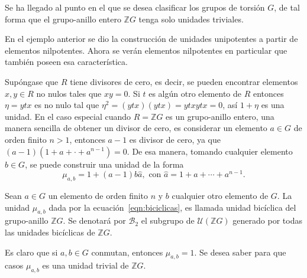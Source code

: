 Se ha llegado al punto en el que se desea clasificar los grupos de torsión $G$, de tal forma que el grupo-anillo entero $\mathds{Z}G$ tenga solo unidades triviales.

\begin{ejemplo}
En el ejemplo anterior se dio la construcción de unidades unipotentes a partir de elementos nilpotentes. Ahora se verán elementos nilpotentes en particular que también poseen esa característica. 

Supóngase que $R$ tiene divisores de cero, es decir, se pueden encontrar elementos $x,y \in R$ no nulos tales que $xy = 0$. Si $t$ es algún otro elemento de $R$ entonces $\eta =ytx$ es no nulo tal que $\eta ^2 = (ytx)(ytx) = ytxytx = 0$, así $1+\eta$ es una unidad. En el caso especial cuando $R =\mathds{Z}G$ es un grupo-anillo entero, una manera sencilla de obtener un divisor de cero, es considerar un elemento $a \in G$ de orden finito $ n >1$, entonces $a-1$ es divisor de cero, ya que $(a-1)(1+a+\cdot+a^{n-1})=0$. De esa manera, tomando cualquier elemento $b \in G$, se puede construir una unidad de la forma 
\begin{equation}\label{eqn:biciclicas}
\mu_{a,b} = 1+(a-1)b\hat{a}, \mbox{ con } \hat{a} = 1+a+\cdots+a^{n-1}.
\end{equation}
\end{ejemplo}
\begin{definicion}
Sean $a \in G$ un elemento de orden finito $n$ y $b$ cualquier otro elemento de $G$. La unidad $\mu_{a,b}$ dada por la ecuación~\eqref{eqn:biciclicas}, es llamada unidad bicíclica del grupo-anillo $\mathds{Z}G$. Se denotará por $\mathcal{B}_2$ el subgrupo de $\mathcal{U}(\mathds{Z}G)$ generado por todas las unidades bicíclicas de $\mathds{Z}G$.
\end{definicion}

Es claro que si $a,b \in G$ conmutan, entonces $\mu_{a,b} = 1$. Se desea saber para que casos $\mu_{a,b}$ es una unidad trivial de $\mathds{Z}G$.

